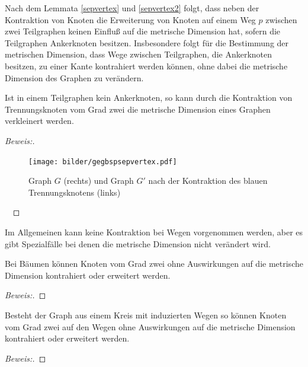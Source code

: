 \begin{bem}
Nach dem Lemmata \ref{sepvertex} und \ref{sepvertex2} folgt, dass neben der Kontraktion von Knoten die Erweiterung von Knoten auf einem Weg $p$ zwischen zwei Teilgraphen keinen Einfluß auf die metrische Dimension hat, sofern die Teilgraphen Ankerknoten besitzen. Insbesondere folgt für die Bestimmung der metrischen Dimension, dass Wege zwischen Teilgraphen, die Ankerknoten besitzen, zu einer Kante kontrahiert werden können, ohne dabei die metrische Dimension des Graphen zu verändern.
\end{bem}
\begin{lem}
Ist in einem Teilgraphen kein Ankerknoten, so kann durch die Kontraktion von Trennungsknoten vom Grad zwei die metrische Dimension eines Graphen verkleinert werden.
\end{lem}
\begin{proof}[Beweis:] ~ \newline
\vspace{-5mm}
\begin{figure}[!h]
\centering
\texttt{[image: bilder/gegbspsepvertex.pdf]}
\caption{Graph $G$ (rechts) und Graph $G'$ nach der Kontraktion des blauen Trennungsknotens (links)}
\end{figure} 
~\linebreak
\end{proof}
Im Allgemeinen kann keine Kontraktion bei Wegen vorgenommen werden, aber es gibt Spezialfälle bei denen die metrische Dimension nicht verändert wird.
\begin{lem}
Bei Bäumen können Knoten vom Grad zwei ohne Auswirkungen auf die metrische Dimension kontrahiert oder erweitert werden.
\end{lem}
\begin{proof}[Beweis:]
\end{proof}
\begin{lem}
\label{sonneerweiterung}
Besteht der Graph aus einem Kreis mit induzierten Wegen so können Knoten vom Grad zwei auf den Wegen ohne Auswirkungen auf die metrische Dimension kontrahiert oder erweitert werden.
\end{lem}
\begin{proof}[Beweis:]
\end{proof}

